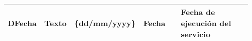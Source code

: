 \begin{table}[H]
\begin{tabular}{>{\bfseries}m{2.5cm} >{\centering}m{2cm} >{}m{4cm} >{\arraybackslash}m{2cm}>{\arraybackslash}m{1cm}>{\arraybackslash}m{6cm}}
DFecha      & Texto             & \{dd/mm/yyyy\}                       & Fecha                               &                                      & Fecha de ejecución del servicio                         \\\bottomrule
\end{tabular}
\end{table}

